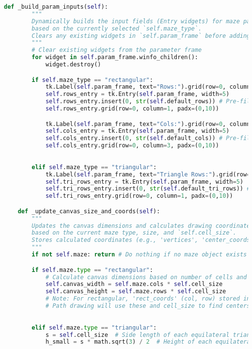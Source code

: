 \documentclass[UTF8]{report}
\theoremstyle{MyLineTheoremStyle} %
\theoremstyle{MyBlockTheoremStyle} %
\theoremstyle{MySubsubsectionStyle} %
\begin{document}
\begin{lstlisting}[language=Python, caption={迷宫生成与求解程序代码}]
    def _build_param_inputs(self):
        """
        Dynamically builds the input fields (Entry widgets) for maze parameters
        based on the currently selected `self.maze_type`.
        Clears any existing widgets in `self.param_frame` before adding new ones.
        """
        # Clear existing widgets from the parameter frame
        for widget in self.param_frame.winfo_children():
            widget.destroy()

        if self.maze_type == "rectangular":
            tk.Label(self.param_frame, text="Rows:").grid(row=0, column=0, sticky="w")
            self.rows_entry = tk.Entry(self.param_frame, width=5)
            self.rows_entry.insert(0, str(self.default_rows)) # Pre-fill with default
            self.rows_entry.grid(row=0, column=1, padx=(0,10))

            tk.Label(self.param_frame, text="Cols:").grid(row=0, column=2, sticky="w")
            self.cols_entry = tk.Entry(self.param_frame, width=5)
            self.cols_entry.insert(0, str(self.default_cols)) # Pre-fill with default
            self.cols_entry.grid(row=0, column=3, padx=(0,10))
        
        
        elif self.maze_type == "triangular": 
            tk.Label(self.param_frame, text="Triangle Rows:").grid(row=0, column=0, sticky="w")
            self.tri_rows_entry = tk.Entry(self.param_frame, width=5)
            self.tri_rows_entry.insert(0, str(self.default_tri_rows)) # Pre-fill with default
            self.tri_rows_entry.grid(row=0, column=1, padx=(0,10))

    def _update_canvas_size_and_coords(self):
        """
        Updates the canvas dimensions and calculates drawing coordinates for each cell
        based on the current maze type, size, and `self.cell_size`.
        Stores calculated coordinates (e.g., 'vertices', 'center_coords') in `self.maze.cells`.
        """
        if not self.maze: return # Do nothing if no maze object exists

        if self.maze.type == "rectangular":
            # Calculate canvas dimensions based on number of cells and cell size
            self.canvas_width = self.maze.cols * self.cell_size
            self.canvas_height = self.maze.rows * self.cell_size
            # Note: For rectangular, 'rect_coords' (col, row) stored in Maze init is sufficient.
            # Path drawing will use these and cell_size to find centers.
        
        
        elif self.maze.type == "triangular":
            s = self.cell_size  # Side length of each equilateral triangle cell
            h_small = s * math.sqrt(3) / 2  # Height of each equilateral triangle cell
            

\end{lstlisting}
\end{document}
